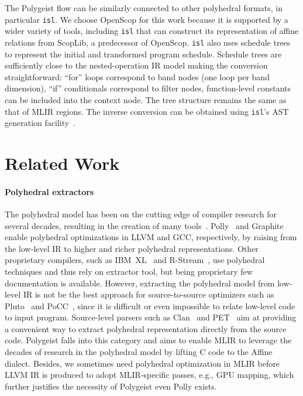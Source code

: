 \documentclass[sigplan]{acmart}
\newcommand{\icode}[1]{{\texttt {#1}}}
\newcommand{\tool}{Polygeist\xspace}
\begin{document}
The \tool flow can be similarly connected to other polyhedral formats, in particular \icode{isl}. We choose OpenScop for this work because it is supported by a wider variety of tools, including \icode{isl} that can construct its representation of affine relations from ScopLib, a predecessor of OpenScop. \icode{isl} also uses schedule trees~\cite{schedule_trees} to represent the initial and transformed program schedule. Schedule trees are sufficiently close to the nested-operation IR model making the conversion straightforward: ``for'' loops correspond to band nodes (one loop per band dimension), ``if'' conditionals correspond to filter nodes, function-level constants can be included into the context node. The tree structure remains the same as that of MLIR regions. The inverse conversion can be obtained using \icode{isl}'s AST generation facility~\cite{grosser2015polyhedral}.

\section{Related Work}

\paragraph{Polyhedral extractors}
The polyhedral model has been on the cutting edge of compiler research for several decades, resulting in the creation of many tools~\cite{feautrier2011polyhedron}. Polly~\cite{grosser.ppl.2012} and Graphite~\cite{pop2006graphite} enable polyhedral optimizations in LLVM and GCC, respectively, by raising from the low-level IR to higher and richer polyhedral representations. Other proprietary compilers, such as IBM~XL~\cite{ibmxl_polyhedral} and R-Stream~\cite{rstream}, use polyhedral techniques and thus rely on extractor tool, but being proprietary few documentation is available. However, extracting the polyhedral model from low-level IR is not be the best approach for source-to-source optimizers such as Pluto~\cite{Bondhugula2008Pluto} and PoCC~\cite{pocc}, since it is difficult or even impossible to relate low-level code to input program. Source-level parsers such as Clan~\cite{bastoul2008clan} and PET~\cite{pet} aim at providing a convenient way to extract polyhedral representation directly from the source code. \tool falls into this category and aims to enable MLIR to leverage the decades of research in the polyhedral model by lifting C code to the Affine dialect. Besides, we sometimes need polyhedral optimization in MLIR before LLVM IR is produced to adopt MLIR-specific passes, e.g., GPU mapping, which further justifies the necessity of \tool even Polly exists.
\end{document}
